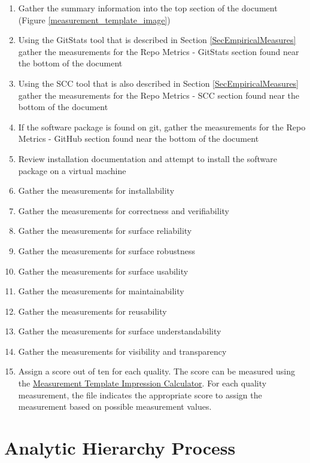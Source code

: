 \documentclass[letterpaper,cleveref]{lipics-v2019}
\theoremstyle{definition}
\begin{document}
\begin{enumerate}
\item Gather the summary information into the top section of the document
  (Figure \ref{measurement_template_image})
\item Using the GitStats tool that is described in Section
  \ref{SecEmpiricalMeasures} gather the measurements for the Repo Metrics -
  GitStats section found near the bottom of the document
\item Using the SCC tool that is also described in Section
  \ref{SecEmpiricalMeasures} gather the measurements for the Repo Metrics - SCC
  section found near the bottom of the document
\item If the software package is found on git, gather the measurements for the
  Repo Metrics - GitHub section found near the bottom of the document
\item Review installation documentation and attempt to install the software
  package on a virtual machine
\item Gather the measurements for installability
\item Gather the measurements for correctness and verifiability
\item Gather the measurements for surface reliability
\item Gather the measurements for surface robustness
\item Gather the measurements for surface usability
\item Gather the measurements for maintainability
\item Gather the measurements for reusability
\item Gather the measurements for surface understandability
\item Gather the measurements for visibility and transparency
\item Assign a score out of ten for each quality. The score can be measured
  using the
  \href{https://github.com/smiths/AIMSS/blob/master/StateOfPractice/Methodology/MeasurementTemplate_ImpressionCalculator.xlsx}
  {Measurement Template Impression Calculator}. For each quality measurement,
  the file indicates the appropriate score to assign the measurement based on
  possible measurement values.
\end{enumerate}

\section{Analytic Hierarchy Process} \label{SecAHP}
\end{document}

